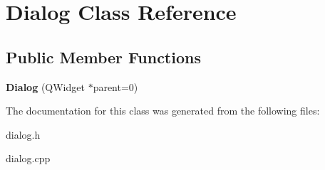 \hypertarget{classDialog}{\section{Dialog Class Reference}
\label{classDialog}
}
\subsection*{Public Member Functions}
\begin{DoxyCompactItemize}
\item 
\hypertarget{classDialog_acfa2063f9f962d394c6a645b6e7e08d8}{{\bfseries Dialog} (Q\-Widget $\ast$parent=0)}\label{classDialog_acfa2063f9f962d394c6a645b6e7e08d8}

\end{DoxyCompactItemize}


The documentation for this class was generated from the following files\-:\begin{DoxyCompactItemize}
\item 
dialog.\-h\item 
dialog.\-cpp\end{DoxyCompactItemize}
